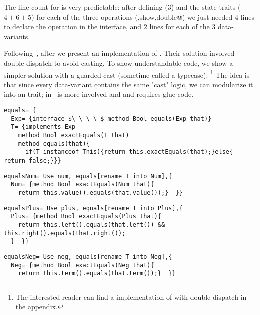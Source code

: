 The line count for \name is very predictable: after defining \Q@exp@ ($3$) and the state traits ($4+6+5$)
for each of the three operations (\Q@eval,show,double@) 
we just needed $4$ lines to declare the operation 
in the interface, and $2$ lines for each of the $3$ data-variants.

Following~\cite{Zenger-Odersky2005}, after \Q@double@ we present an implementation of \Q@equals@.
Their solution involved double dispatch to avoid casting.
To show understandable code, we show a simpler solution 
with a guarded cast (sometime called a typecase).%
\footnote{
The interested reader can find a \name implementation of \Q@equals@ with double dispatch
in the appendix.
}
The idea is that since every data-variant contains
 the same "cast" logic, 
 we can modularize it into an \Q@equals@ trait;
\Q@equals@ in~\cite{Zenger-Odersky2005} is more involved and
 and requires glue code.
\saveSpace\saveSpace
\begin{lstlisting}
equals= {
  Exp= {interface $\ \ \ \ $ method Bool equals(Exp that)}
  T= {implements Exp
    method Bool exactEquals(T that)
    method equals(that){
      if(T instanceof This){return this.exactEquals(that);}else{ return false;}}}
\end{lstlisting}
\multiCode
\begin{lstlisting}
equalsNum= Use num, equals[rename T into Num],{
  Num= {method Bool exactEquals(Num that){
    return this.value().equals(that.value());}  }}
\end{lstlisting}
\multiCode
\begin{lstlisting}
equalsPlus= Use plus, equals[rename T into Plus],{
  Plus= {method Bool exactEquals(Plus that){
    return this.left().equals(that.left()) && this.right().equals(that.right());
  }  }}
\end{lstlisting}
\multiCode
\begin{lstlisting}
equalsNeg= Use neg, equals[rename T into Neg],{
  Neg= {method Bool exactEquals(Neg that){
    return this.term().equals(that.term());}  }}
\end{lstlisting}
\saveSpace\saveSpace

